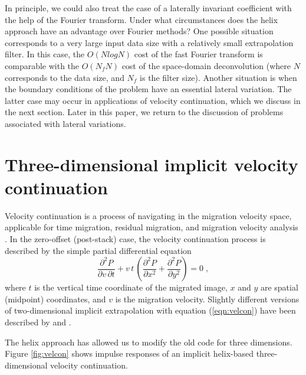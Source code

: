 \par
In principle, we could also treat the case of a laterally invariant
coefficient with the help of the Fourier transform. Under what
circumstances does the helix approach have an advantage over Fourier
methods? One possible situation corresponds to a very large input data
size with a relatively small extrapolation filter. In this case, the
$O(N log N)$ cost of the fast Fourier transform is comparable with the
$O(N_f N)$ cost of the space-domain deconvolution (where $N$
corresponds to the data size, and $N_f$ is the filter size). Another
situation is when the boundary conditions of the problem have an
essential lateral variation. The latter case may occur in applications
of velocity continuation, which we discuss in the next section.  Later
in this paper, we return to the discussion of problems associated with
lateral variations.

\section{Three-dimensional implicit velocity continuation}

Velocity continuation is a process of navigating in the migration
velocity space, applicable for time migration, residual migration, and
migration velocity analysis \cite[]{Fomel.sep.92.159}. In the
zero-offset (post-stack) case, the velocity continuation process is
described by the simple partial differential equation
\cite[]{Claerbout.sep.48.79,me}
\begin{equation}
  {\frac{\partial^2 P}{\partial v\,\partial t}} +
  {v\,t\,\left({\frac{\partial^2 P}{\partial x^2}} + {\frac{\partial^2
      P}{\partial y^2}}\right)} = 0\;,
\label{eqn:velcon}
\end{equation}
where $t$ is the vertical time coordinate of the migrated image, $x$
and $y$ are spatial (midpoint) coordinates, and $v$ is the migration
velocity. Slightly different versions of two-dimensional implicit
extrapolation with equation (\ref{eqn:velcon}) have been described by
\cite{Li.sep.48.85} and \cite[]{Fomel.sep.92.159}. 

\par
The helix approach has allowed us to modify the old code for three
dimensions. Figure \ref{fig:velcon} shows impulse responses of an
implicit helix-based three-dimensional velocity continuation.

